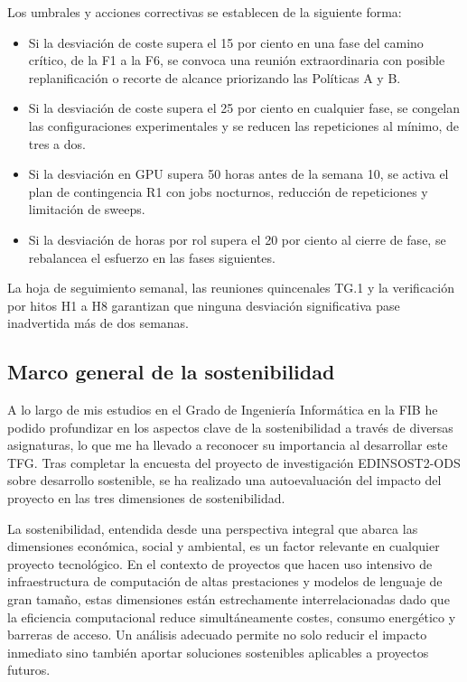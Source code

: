 \documentclass[11pt,a4paper]{article}
\begin{document}
Los umbrales y acciones correctivas se establecen de la siguiente forma:
\begin{itemize}[nosep]
\item Si la desviación de coste supera el 15 por ciento en una fase del camino crítico, de la F1 a la F6, se convoca una reunión extraordinaria con posible replanificación o recorte de alcance priorizando las Políticas A y B.
\item Si la desviación de coste supera el 25 por ciento en cualquier fase, se congelan las configuraciones experimentales y se reducen las repeticiones al mínimo, de tres a dos.
\item Si la desviación en GPU supera 50 horas antes de la semana 10, se activa el plan de contingencia R1 con jobs nocturnos, reducción de repeticiones y limitación de sweeps.
\item Si la desviación de horas por rol supera el 20 por ciento al cierre de fase, se rebalancea el esfuerzo en las fases siguientes.
\end{itemize}

\noindent La hoja de seguimiento semanal, las reuniones quincenales TG.1 y la verificación por hitos H1 a H8 garantizan que ninguna desviación significativa pase inadvertida más de dos semanas.

\subsection{Marco general de la sostenibilidad}

A lo largo de mis estudios en el Grado de Ingeniería Informática en la FIB he podido profundizar en los aspectos clave de la sostenibilidad a través de diversas asignaturas, lo que me ha llevado a reconocer su importancia al desarrollar este TFG. Tras completar la encuesta del proyecto de investigación EDINSOST2-ODS sobre desarrollo sostenible, se ha realizado una autoevaluación del impacto del proyecto en las tres dimensiones de sostenibilidad.

La sostenibilidad, entendida desde una perspectiva integral que abarca las dimensiones económica, social y ambiental, es un factor relevante en cualquier proyecto tecnológico. En el contexto de proyectos que hacen uso intensivo de infraestructura de computación de altas prestaciones y modelos de lenguaje de gran tamaño, estas dimensiones están estrechamente interrelacionadas dado que la eficiencia computacional reduce simultáneamente costes, consumo energético y barreras de acceso. Un análisis adecuado permite no solo reducir el impacto inmediato sino también aportar soluciones sostenibles aplicables a proyectos futuros.
\end{document}
